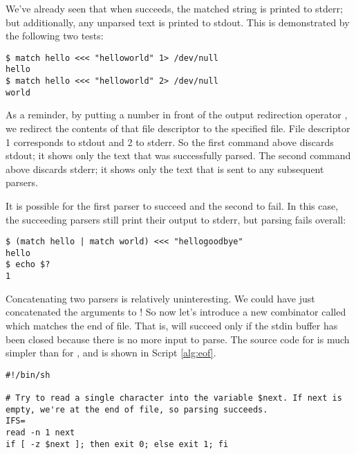 \documentclass{sigplanconf}
\newcommand{\sh}[1]{{\ttfamily {#1}}}
\begin{document}
We've already seen that when \sh{match} succeeds, the matched string is printed to stderr;
but additionally, any unparsed text is printed to stdout.
This is demonstrated by the following two tests:
\begin{lstlisting}
$ match hello <<< "helloworld" 1> /dev/null
hello
$ match hello <<< "helloworld" 2> /dev/null
world
\end{lstlisting}
As a reminder, by putting a number in front of the output redirection operator \sh{>}, we redirect the contents of that file descriptor to the specified file.
File descriptor 1 corresponds to stdout and 2 to stderr.
So the first command above discards stdout; it shows only the text that was successfully parsed.
The second command above discards stderr; it shows only the text that is sent to any subsequent parsers.

It is possible for the first parser to succeed and the second to fail.
In this case, the succeeding parsers still print their output to stderr, but parsing fails overall:
\begin{lstlisting}
$ (match hello | match world) <<< "hellogoodbye"
hello
$ echo $?
1
\end{lstlisting}

Concatenating two \sh{match} parsers is relatively uninteresting.
We could have just concatenated the arguments to \sh{match}!
So now let's introduce a new combinator called \sh{eof} which matches the end of file.
That is, \sh{eof} will succeed only if the stdin buffer has been closed because there is no more input to parse.
The source code for \sh{eof} is much simpler than for \sh{match}, and is shown in Script \ref{alg:eof}.

\begin{algorithm}[t]
\caption{\sh{eof}}
\label{alg:eof}
\begin{lstlisting}
#!/bin/sh

# Try to read a single character into the variable $next. If next is empty, we're at the end of file, so parsing succeeds.
IFS=
read -n 1 next
if [ -z $next ]; then exit 0; else exit 1; fi

\end{lstlisting}
\end{algorithm}
\end{document}
